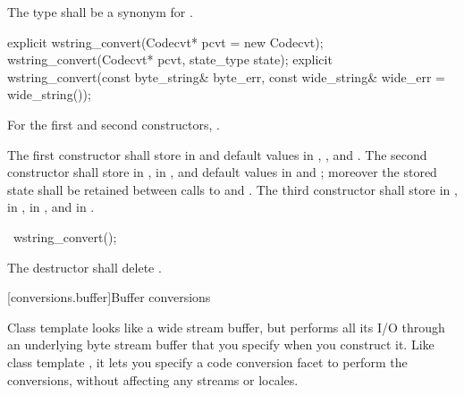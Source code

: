 \begin{itemdescr}
\pnum
The type shall be a synonym for .
\end{itemdescr}

%
\begin{itemdecl}
explicit wstring_convert(Codecvt* pcvt = new Codecvt);
wstring_convert(Codecvt* pcvt, state_type state);
explicit wstring_convert(const byte_string& byte_err,
    const wide_string& wide_err = wide_string());
\end{itemdecl}

\begin{itemdescr}
\pnum
\requires
For the first and second constructors, .

\pnum
\effects
The first constructor shall store  in  and
default values in , , and
.
The second constructor shall store  in ,
 in , and default values in
 and ; moreover the
stored state shall be retained between calls to  and
.
The third constructor shall store  in ,
 in , 
in , and  in
.
\end{itemdescr}

%
\begin{itemdecl}
~wstring_convert();
\end{itemdecl}

\begin{itemdescr}
\pnum
\effects The destructor shall delete .
\end{itemdescr}

[conversions.buffer]{Buffer conversions}

\pnum
Class template  looks like a wide stream buffer, but
performs all its I/O through an underlying byte stream buffer that you
specify when you construct it. Like class template , it
lets you specify a code conversion facet to perform the conversions,
without affecting any streams or locales.

\pnum
{}

